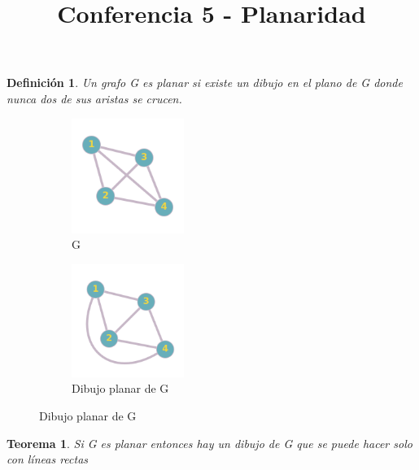 \documentclass[a4paper,1pt]{report}
\title{Conferencia 5 - Planaridad}
\author{}
\newtheorem*{teo}{Teorema}
\newtheorem*{dfn}{Definición}
\begin{document}
\maketitle


\begin{dfn}
 Un grafo G es planar si existe un dibujo en el plano de G donde nunca dos de sus aristas se crucen.
\end{dfn}


\begin{figure}[H]
    \centering
    \begin{subfigure}[b]{0.45\textwidth}
    \centering
    \includegraphics[width=0.4\textwidth]{figures5/G.png}
    \caption{G}
    \end{subfigure}
    \begin{subfigure}[b]{0.45\textwidth}
        \centering
    \includegraphics[width=0.4\textwidth]{figures5/Gplanar.png}
    \caption{Dibujo planar de G}
    \end{subfigure}
\end{figure} 

\begin{teo}
 Si G es planar entonces hay un dibujo de G que se puede hacer solo con líneas rectas
\end{teo}
\end{document}

